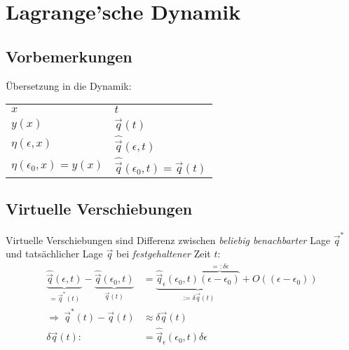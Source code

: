 
\section{Lagrange'sche Dynamik} %
	\subsection{Vorbemerkungen} %
		Übersetzung in die Dynamik:
		\begin{center}
			\begin{tabular}{l@{\quad$\Leftrightarrow$\quad}l}
				$x$ & $t$ \\
				$y(x)$ & $\vec q(t)$ \\
				$\eta(\epsilon, x)$ & $\hat{\vec q}(\epsilon, t)$ \\
				$\eta(\epsilon_0, x) = y(x)$ & $\hat{\vec q}(\epsilon_0, t) = \vec q(t)$ \\
			\end{tabular}
		\end{center}
	
	\subsection{Virtuelle Verschiebungen} %
		\begin{definition}
			Virtuelle Verschiebungen sind Differenz zwischen \emph{beliebig benachbarter} Lage $\vec q^*$ und tatsächlicher Lage $\vec q$ bei \emph{festgehaltener} Zeit $t$:
			\begin{align*}
				\underbrace{\hat{\vec{q}}(\epsilon, t)}_{= \vec{q}^*(t)} - \underbrace{\hat{\vec{q}}(\epsilon_0, t)}_{\vec{q}(t)}  &=  \underbrace{\hat{\vec{q}}_\epsilon(\epsilon_0, t)\overbrace{(\epsilon - \epsilon_0)}^{=:\delta \epsilon}}_{:=\delta \vec{q}(t)} + O\left( (\epsilon - \epsilon_0) \right) \\
				\Rightarrow \ \vec{q}^*(t) - \vec{q}(t) &\approx \delta \vec{q}(t) \\
				\delta \vec q(t) :&= \hat{\vec q}_\epsilon(\epsilon_0, t) \delta \epsilon
			\end{align*}
		\end{definition}
		
